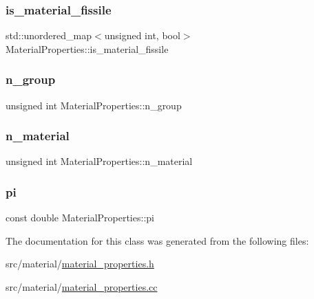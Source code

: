 \subsubsection{\texorpdfstring{is\+\_\+material\+\_\+fissile}{is\_material\_fissile}}
{\footnotesize\ttfamily std\+::unordered\+\_\+map$<$unsigned int, bool$>$ Material\+Properties\+::is\+\_\+material\+\_\+fissile\hspace{0.3cm}{\ttfamily [private]}}

\mbox{\label{class_material_properties_a4cae7eee21ea5ed5246765c049caf58b}} 
\subsubsection{\texorpdfstring{n\+\_\+group}{n\_group}}
{\footnotesize\ttfamily unsigned int Material\+Properties\+::n\+\_\+group\hspace{0.3cm}{\ttfamily [private]}}

\mbox{\label{class_material_properties_a3bc9713ea94f32fb93d60f2a726e4f2d}} 
\subsubsection{\texorpdfstring{n\+\_\+material}{n\_material}}
{\footnotesize\ttfamily unsigned int Material\+Properties\+::n\+\_\+material\hspace{0.3cm}{\ttfamily [private]}}

\mbox{\label{class_material_properties_a28173c461cf9a74c3b0ebe0f51c386d3}} 
\subsubsection{\texorpdfstring{pi}{pi}}
{\footnotesize\ttfamily const double Material\+Properties\+::pi\hspace{0.3cm}{\ttfamily [private]}}



The documentation for this class was generated from the following files\+:\begin{DoxyCompactItemize}
\item 
src/material/\hyperlink{material__properties_8h}{material\+\_\+properties.\+h}\item 
src/material/\hyperlink{material__properties_8cc}{material\+\_\+properties.\+cc}\end{DoxyCompactItemize}
